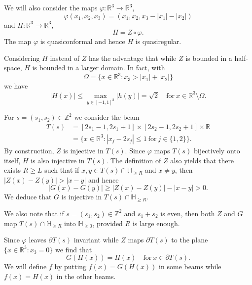 \documentclass[12pt,a4paper]{amsart}
\theoremstyle{plain}
\theoremstyle{definition}
\theoremstyle{remark}
\def\R{\mathbb R}
\def\Z{\mathbb Z}
\def\H{\mathbb H}
\numberwithin{equation}{section}
\begin{document}
We will also consider the maps 
$\varphi\colon \R^3\to\R^3$,
\begin{equation}\label{1c2}
\varphi(x_1,x_2,x_3)=(x_1,x_2,x_3-|x_1|-|x_2|)
\end{equation}
and $H\colon \R^3\to\R^3$,
\begin{equation}\label{1c3}
H=Z\circ\varphi .
\end{equation}
The map $\varphi$ is quasiconformal and hence $H$ is quasiregular.

Considering $H$ instead of $Z$ has the advantage that while
$Z$ is bounded in a half-space, $H$ is bounded in a larger domain.
In fact, with 
\begin{equation}\label{1c4}
\Omega=\{x\in\R^3\colon x_3> |x_1|+|x_2|\}
\end{equation}
we have 
\begin{equation}\label{1c5}
|H(x)|\leq \max_{y\in[-1,1]^2}|h(y)|=\sqrt{2}
\quad\text{for}\ x\in\R^3\setminus\Omega.
\end{equation}

For $s=(s_1,s_2)\in\Z^2$ we consider the beam
\begin{equation}\label{1d}
\begin{aligned}
T(s)
&=[2s_1-1,2s_1+1]\times [2s_2-1,2s_2+1]\times\R
\\ &
=\{x\in\R^3\colon |x_j-2s_j|\leq 1\ \text{for}\ j\in\{1,2\}\}.
\end{aligned}
\end{equation}
By construction, $Z$ is injective in $T(s)$.
Since $\varphi$ maps $T(s)$ bijectively onto itself, 
$H$ is also injective in $T(s)$.
The definition of $Z$ also yields that there exists $R\geq L$ such 
that if $x,y\in T(s)\cap\H_{\geq R}$ and $x\neq y$, then $|Z(x)-Z(y)|>|x-y|$ and hence
\begin{equation}\label{1d1}
|G(x)-G(y)|\geq |Z(x)-Z(y)|-|x-y|>0 .
\end{equation}
We deduce that $G$ is injective in $T(s)\cap\H_{\geq R}$.

We also note that if $s=(s_1,s_2)\in\Z^2$ and $s_1+s_2$ is even, then
both $Z$ and $G$ map  $T(s)\cap\H_{\geq R}$ into
$\H_{\geq 0}$, provided $R$ is large enough.

Since  $\varphi$ leaves $\partial T(s)$ invariant while
$Z$ maps $\partial T(s)$ to the plane $\{x\in\R^3\colon x_3=0\}$ 
we find that 
\begin{equation}\label{1e}
G(H(x))=H(x)\quad\text{for}\ x\in\partial T(s). 
\end{equation}
We will define $f$ by putting $f(x)=G(H(x))$ in some beams while
$f(x)=H(x)$ in the other beams. 
\end{document}
